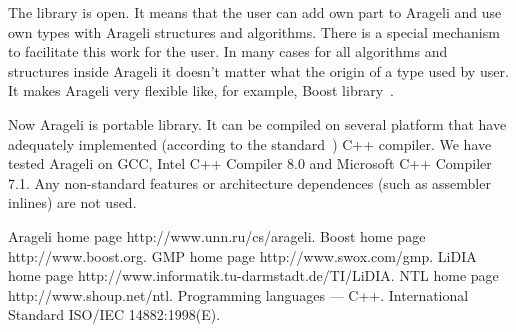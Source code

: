 \documentclass{llncs}
\begin{document}
The library is open. It means that the user can add own part to Arageli and use own types with Arageli structures and algorithms. There is a special mechanism to facilitate this work for the user. In many cases for all algorithms and structures inside Arageli it doesn't matter what the origin of a type used by user. It makes Arageli very flexible like, for example, Boost library~\cite{Boost}.

Now Arageli is portable library. It can be compiled on several platform that have adequately implemented (according to the standard~\cite{ISOCPP}) C++ compiler. We have tested Arageli on GCC, Intel C++ Compiler 8.0 and Microsoft C++ Compiler 7.1. Any non-standard features or architecture dependences (such as assembler inlines) are not used.


\begin{thebibliography}{9}

 Arageli home page http://www.unn.ru/cs/arageli.
 Boost home page http://www.boost.org.
 GMP home page http://www.swox.com/gmp.
 LiDIA home page http://www.informatik.tu-darmstadt.de/TI/LiDIA.
 NTL home page http://www.shoup.net/ntl.
 Programming languages --- C++. International Standard ISO/IEC 14882:1998(E).

\end{thebibliography}
\end{document}
